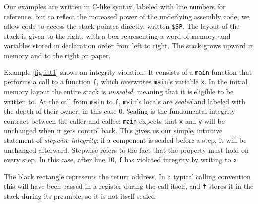 \documentclass[acmsmall,review,anonymous]{acmart}\settopmatter{printfolios=true,printccs=false,printacmref=false}
\begin{document}
Our examples are written in C-like syntax, labeled with line numbers for reference,
but to reflect the increased power of the underlying assembly code, we allow code
to access the stack pointer directly, written {\tt \$SP}. The layout of the stack
is given to the right, with a box representing a word of memory, and variables stored
in declaration order from left to right. The stack grows upward in memory and to the
right on paper.



Example \ref{fig:int1} shows an integrity violation. It consists of a {\tt main}
function that performs a call to a function {\tt f}, which overwrites {\tt main}'s
variable {\tt x}. In the initial memory layout the entire stack is {\em unsealed},
meaning that it is eligible to be written to. At the call from {\tt main} to
{\tt f}, {\tt main}'s locals are {\em sealed} and labeled with the depth of their owner,
in this case 0. Sealing is the fundamental integrity contract between the caller and callee:
{\tt main} expects that {\tt x} and {\tt y} will be unchanged when it gets control back.
This gives us our simple, intuitive statement of {\em stepwise integrity}:
if a component is sealed before a step, it will be unchanged afterward. Stepwise
refers to the fact that the property must hold on every step. %
In this case, after line 10, {\tt f} has violated integrity by writing to {\tt x}.

The black rectangle represents the return address. In a typical calling convention
this will have been passed in a register during the call itself, and {\tt f} stores
it in the stack during its preamble, so it is not itself sealed.
\end{document}
